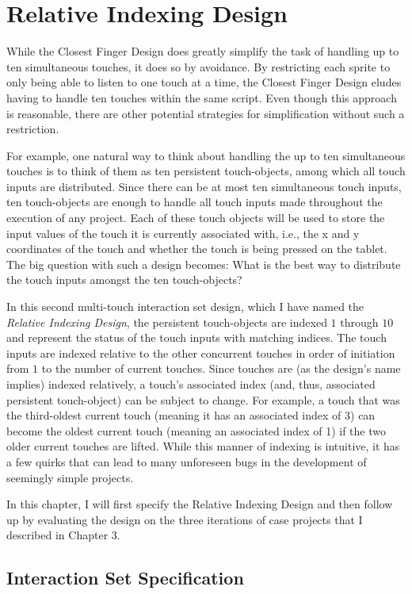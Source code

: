 \chapter{Relative Indexing Design}
While the Closest Finger Design does greatly simplify the task of handling up to ten simultaneous touches, it does so by avoidance. By restricting each sprite to only being able to listen to one touch at a time, the Closest Finger Design eludes having to handle ten touches within the same script. Even though this approach is reasonable, there are other potential strategies for simplification without such a restriction.

For example, one natural way to think about handling the up to ten simultaneous touches is to think of them as ten persistent touch-objects, among which all touch inputs are distributed. Since there can be at most ten simultaneous touch inputs, ten touch-objects are enough to handle all touch inputs made throughout the execution of any project. Each of these touch objects will be used to store the input values of the touch it is currently associated with, i.e., the x and y coordinates of the touch and whether the touch is being pressed on the tablet. The big question with such a design becomes: What is the best way to distribute the touch inputs amongst the ten touch-objects?

In this second multi-touch interaction set design, which I have named the \emph{Relative Indexing Design}, the persistent touch-objects are indexed $1$ through $10$ and represent the status of the touch inputs with matching indices. The touch inputs are indexed relative to the other concurrent touches in order of initiation from $1$ to the number of current touches. Since touches are (as the design's name implies) indexed relatively, a touch's associated index (and, thus, associated persistent touch-object) can  be subject to change. For example, a touch that was the third-oldest current touch (meaning it has an associated index of 3) can become the oldest current touch (meaning an associated index of 1) if the two older current touches are lifted. While this manner of indexing is intuitive, it has a few quirks that can lead to many unforeseen bugs in the development of seemingly simple projects.

In this chapter, I will first specify the Relative Indexing Design and then follow up by evaluating the design on the three iterations of case projects that I described in Chapter 3.

\section{Interaction Set Specification}


